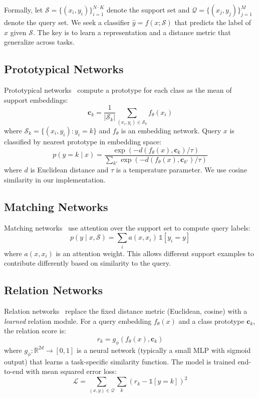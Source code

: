 Formally, let $\mathcal{S} = \{(x_i, y_i)\}_{i=1}^{N \cdot K}$ denote the support set and $\mathcal{Q} = \{(x_j, y_j)\}_{j=1}^{M}$ denote the query set. We seek a classifier $\hat{y} = f(x; \mathcal{S})$ that predicts the label of $x$ given $\mathcal{S}$. The key is to learn a representation and a distance metric that generalize across tasks.

\subsection{Prototypical Networks}

Prototypical networks~\cite{snell2017prototypical} compute a prototype for each class as the mean of support embeddings:
\begin{equation}
\mathbf{c}_k = \frac{1}{|\mathcal{S}_k|} \sum_{(x_i, y_i) \in \mathcal{S}_k} f_\theta(x_i)
\end{equation}
where $\mathcal{S}_k = \{(x_i, y_i) : y_i = k\}$ and $f_\theta$ is an embedding network. Query $x$ is classified by nearest prototype in embedding space:
\begin{equation}
p(y = k \mid x) = \frac{\exp(-d(f_\theta(x), \mathbf{c}_k) / \tau)}{\sum_{k'} \exp(-d(f_\theta(x), \mathbf{c}_{k'}) / \tau)}
\end{equation}
where $d$ is Euclidean distance and $\tau$ is a temperature parameter. We use cosine similarity in our implementation.

\subsection{Matching Networks}

Matching networks~\cite{vinyals2016matching} use attention over the support set to compute query labels:
\begin{equation}
p(y \mid x, \mathcal{S}) = \sum_{i} a(x, x_i) \, \mathbb{1}[y_i = y]
\end{equation}
where $a(x, x_i)$ is an attention weight. This allows different support examples to contribute differently based on similarity to the query.

\subsection{Relation Networks}

Relation networks~\cite{sung2018learning} replace the fixed distance metric (Euclidean, cosine) with a \emph{learned} relation module. For a query embedding $f_\theta(x)$ and a class prototype $\mathbf{c}_k$, the relation score is:
\begin{equation}
r_k = g_\phi(f_\theta(x), \mathbf{c}_k)
\end{equation}
where $g_\phi: \mathbb{R}^{2d} \to [0,1]$ is a neural network (typically a small MLP with sigmoid output) that learns a task-specific similarity function. The model is trained end-to-end with mean squared error loss:
\begin{equation}
\mathcal{L} = \sum_{(x,y) \in \mathcal{Q}} \sum_k (r_k - \mathbb{1}[y=k])^2
\end{equation}

